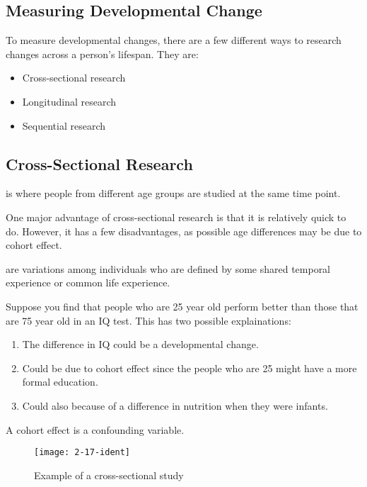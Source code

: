 \documentclass[../main/main.tex]{subfiles}
\begin{document}
\subsection{Measuring Developmental Change}
To measure developmental changes, there are a few different ways to research changes across a person's lifespan. They are:
\begin{itemize}
\item Cross-sectional research
\item Longitudinal research
\item Sequential research
\end{itemize}
\subsection{Cross-Sectional Research}
\begin{definition}
 is where people from different age groups are studied at the same time point. 
\end{definition}
One major advantage of cross-sectional research is that it is relatively quick to do. However, it has a few disadvantages, as possible age differences may be due to cohort effect.

\begin{definition} 
 are  variations among individuals who are defined by some shared temporal experience or common life experience.
\end{definition}
\begin{example}
  Suppose you find that people who are 25 year old perform better than those that are 75 year old in an IQ test. This has two possible explainations:
  \begin{enumerate}
    \item The difference in IQ could be a developmental change.
          \item Could be due to cohort effect since the people who are 25 might have a more formal education.
          \item Could also because of a difference in nutrition when they were infants.
  \end{enumerate}
\end{example}
\begin{remark}
A cohort effect is a confounding variable.
\end{remark}

\begin{figure}[htpb]
  \centering
  \texttt{[image: 2-17-ident]}
  \caption{Example of a cross-sectional study}
  \label{2-17-ident}
\end{figure}
\end{document}

